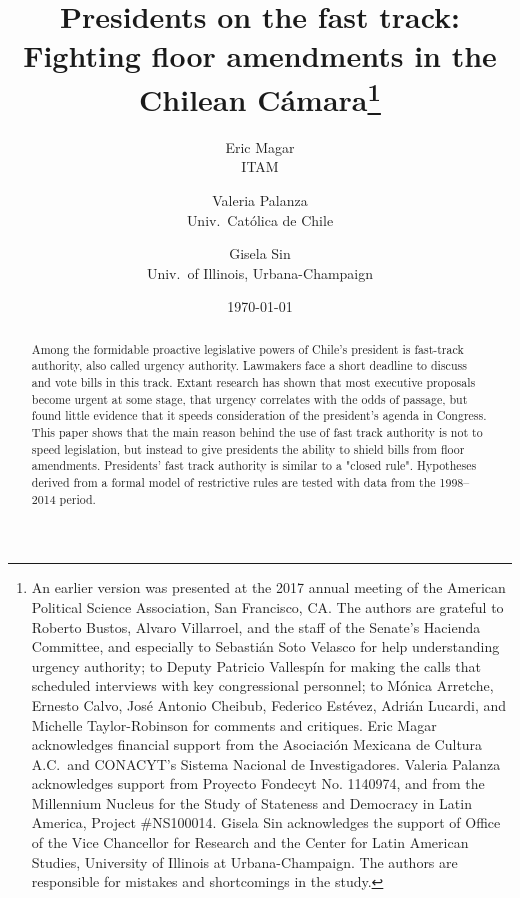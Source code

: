 \documentclass[letter,12pt]{article}
\begin{document}

\title{Presidents on the fast track: Fighting floor amendments in the Chilean Cámara\thanks{An earlier version was presented at the 2017 annual meeting of the American Political Science Association, San Francisco, CA. The authors are grateful to Roberto Bustos, Alvaro Villarroel, and the staff of the Senate's Hacienda Committee, and especially to Sebastián Soto Velasco for help understanding urgency authority; to Deputy Patricio Vallespín for making the calls that scheduled interviews with key congressional personnel; to Mónica Arretche, Ernesto Calvo, José Antonio Cheibub, Federico Estévez, Adrián Lucardi, and Michelle Taylor-Robinson for comments and critiques. Eric Magar acknowledges financial support from the Asociación Mexicana de Cultura A.C.\ and CONACYT's Sistema Nacional de Investigadores. Valeria Palanza acknowledges support from Proyecto Fondecyt No. 1140974, and from the Millennium Nucleus for the Study of Stateness and Democracy in Latin America, Project \#NS100014. Gisela Sin acknowledges the support of Office of the Vice Chancellor for Research and the Center for Latin American Studies, University of Illinois at Urbana-Champaign. The authors are responsible for mistakes and shortcomings in the study.}}
\author{Eric Magar \\ ITAM \and
        Valeria Palanza \\ Univ.\ Católica de Chile \and  
        Gisela Sin \\ Univ.\ of Illinois, Urbana-Champaign 
}
\date{\today}
\maketitle


\begin{abstract}
\noindent Among the formidable proactive legislative powers of Chile's president is fast-track authority, also called urgency authority. Lawmakers face a short deadline to discuss and vote bills in this track. Extant research has shown that most executive proposals become urgent at some stage, that urgency correlates with the odds of passage, but found little evidence that it speeds consideration of the president's agenda in Congress. This paper shows that the main reason behind the use of fast track authority is not to speed legislation, but instead to give presidents the ability to shield bills from floor amendments. Presidents' fast track authority is similar to a "closed rule". Hypotheses derived from a formal model of restrictive rules are tested with data from the 1998--2014 period.
\end{abstract}
\end{document}
